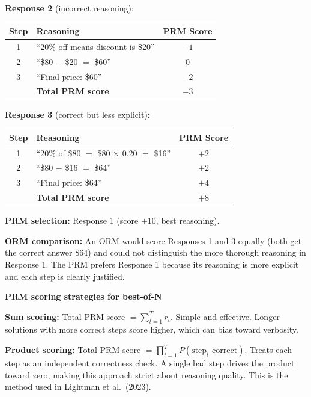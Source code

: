 \begin{chapterenv}
\textbf{Response 2} (incorrect reasoning):

\begin{center}
\begin{tabular}{clc}
\toprule
\textbf{Step} & \textbf{Reasoning} & \textbf{PRM Score} \\
\midrule
1 & ``20\% off means discount is \$20'' & $-1$ \\
2 & ``\$80 $-$ \$20 $=$ \$60'' & $0$ \\
3 & ``Final price: \$60'' & $-2$ \\
\midrule
& \textbf{Total PRM score} & $-3$ \\
\bottomrule
\end{tabular}
\end{center}

\textbf{Response 3} (correct but less explicit):

\begin{center}
\begin{tabular}{clc}
\toprule
\textbf{Step} & \textbf{Reasoning} & \textbf{PRM Score} \\
\midrule
1 & ``20\% of \$80 $=$ \$80 $\times$ 0.20 $=$ \$16'' & $+2$ \\
2 & ``\$80 $-$ \$16 $=$ \$64'' & $+2$ \\
3 & ``Final price: \$64'' & $+4$ \\
\midrule
& \textbf{Total PRM score} & $+8$ \\
\bottomrule
\end{tabular}
\end{center}

\textbf{PRM selection:} Response 1 (score $+10$, best reasoning).

\textbf{ORM comparison:} An ORM would score Responses 1 and 3 equally (both get the correct answer \$64) and could not distinguish the more thorough reasoning in Response 1. The PRM prefers Response 1 because its reasoning is more explicit and each step is clearly justified.

\begin{infobox}
\textbf{PRM scoring strategies for best-of-N}

\textbf{Sum scoring:} Total PRM score $= \sum_{t=1}^{T} r_t$. Simple and effective. Longer solutions with more correct steps score higher, which can bias toward verbosity.

\textbf{Product scoring:} Total PRM score $= \prod_{t=1}^{T} P(\text{step}_t \text{ correct})$. Treats each step as an independent correctness check. A single bad step drives the product toward zero, making this approach strict about reasoning quality. This is the method used in Lightman et al.\ (2023).


\end{infobox}
\end{chapterenv}
